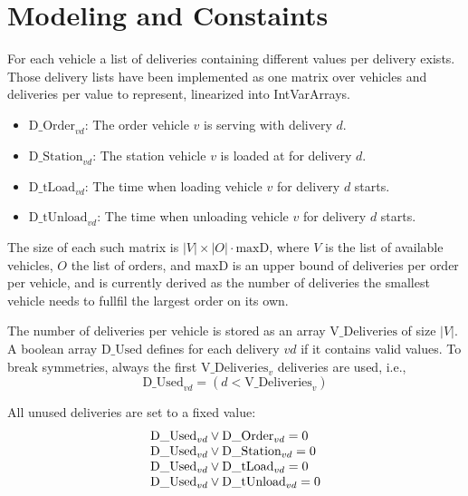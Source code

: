 \documentclass[a4paper]{article}
\begin{document}
\section{Modeling and Constaints}

For each vehicle a list of deliveries containing different values per delivery exists. Those delivery lists have been implemented
as one matrix over vehicles and deliveries per value to represent, linearized into IntVarArrays.

\newcommand{\DOrder}{\text{D\_Order}}
\newcommand{\DStation}{\text{D\_Station}}
\newcommand{\DtLoad}{\text{D\_tLoad}}
\newcommand{\DtUnload}{\text{D\_tUnload}}
\newcommand{\maxD}{\text{maxD}}
\newcommand{\VDeliveries}{\text{V\_Deliveries}}
\newcommand{\ODeliveries}{\text{O\_Deliveries}}
\newcommand{\DUsed}{\text{D\_Used}}
\newcommand{\DdTtravelTo}{\text{D\_dTTravelTo}}
\newcommand{\DdTtravelFrom}{\text{D\_dTTravelFrom}}

\begin{itemize}
\item $\DOrder_{vd}$: The order vehicle $v$ is serving with delivery $d$.
\item $\DStation_{vd}$: The station vehicle $v$ is loaded at for delivery $d$.
\item $\DtLoad_{vd}$: The time when loading vehicle $v$ for delivery $d$ starts.
\item $\DtUnload_{vd}$: The time when unloading vehicle $v$ for delivery $d$ starts.
\end{itemize}

The size of each such matrix is $|V| \times |O| \cdot \maxD$, where $V$ is the list of available vehicles, $O$ the list of
orders, and $\maxD$ is an upper bound of deliveries per order per vehicle, and is currently derived as the number of
deliveries the smallest vehicle needs to fullfil the largest order on its own.

The number of deliveries per vehicle is stored as an array $\VDeliveries$ of size $|V|$. A boolean array $\DUsed$
defines for each delivery $vd$ if it contains valid values. To break symmetries, always the first $\VDeliveries_v$
deliveries are used, i.e.,
\[
  \DUsed_{vd} = (d < \VDeliveries_v)
\]

All unused deliveries are set to a fixed value:
\[
\begin{array}[b]{l}
  \DUsed_{vd} \vee \DOrder_{vd} = 0  \\
  \DUsed_{vd} \vee \DStation_{vd} = 0 \\
  \DUsed_{vd} \vee \DtLoad_{vd} = 0 \\
  \DUsed_{vd} \vee \DtUnload_{vd} = 0
\end{array}
\]
\end{document}
